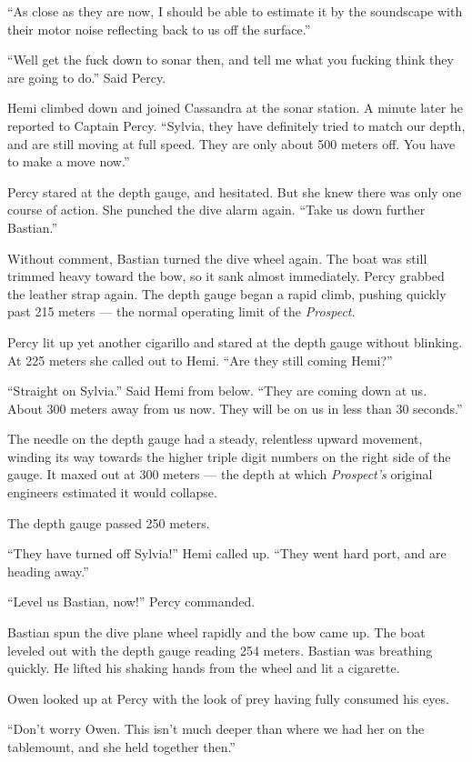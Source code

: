 \documentclass[
]{scrbook}
\begin{document}
``As close as they are now, I should be able to estimate it by the
soundscape with their motor noise reflecting back to us off the
surface.''

``Well get the fuck down to sonar then, and tell me what you fucking
think they are going to do.'' Said Percy.

Hemi climbed down and joined Cassandra at the sonar station. A minute
later he reported to Captain Percy. ``Sylvia, they have definitely tried
to match our depth, and are still moving at full speed. They are only
about 500 meters off. You have to make a move now.''

Percy stared at the depth gauge, and hesitated. But she knew there was
only one course of action. She punched the dive alarm again. ``Take us
down further Bastian.''

Without comment, Bastian turned the dive wheel again. The boat was still
trimmed heavy toward the bow, so it sank almost immediately. Percy
grabbed the leather strap again. The depth gauge began a rapid climb,
pushing quickly past 215 meters --- the normal operating limit of the
\emph{Prospect}.

Percy lit up yet another cigarillo and stared at the depth gauge without
blinking. At 225 meters she called out to Hemi. ``Are they still coming
Hemi?''

``Straight on Sylvia.'' Said Hemi from below. ``They are coming down at
us. About 300 meters away from us now. They will be on us in less than
30 seconds.''

The needle on the depth gauge had a steady, relentless upward movement,
winding its way towards the higher triple digit numbers on the right
side of the gauge. It maxed out at 300 meters --- the depth at which
\emph{Prospect's} original engineers estimated it would collapse.

The depth gauge passed 250 meters.

``They have turned off Sylvia!'' Hemi called up. ``They went hard port,
and are heading away.''

``Level us Bastian, now!'' Percy commanded.

Bastian spun the dive plane wheel rapidly and the bow came up. The boat
leveled out with the depth gauge reading 254 meters. Bastian was
breathing quickly. He lifted his shaking hands from the wheel and lit a
cigarette.

Owen looked up at Percy with the look of prey having fully consumed his
eyes.

``Don't worry Owen. This isn't much deeper than where we had her on the
tablemount, and she held together then.''
\end{document}
